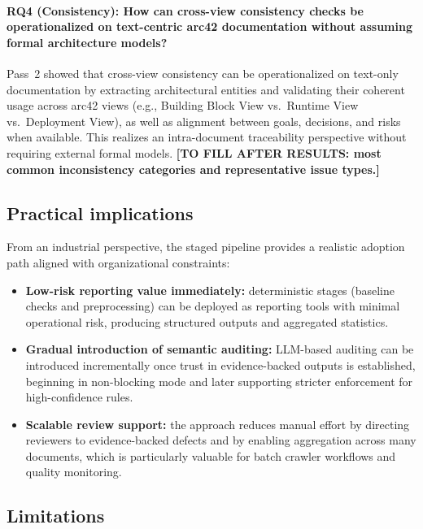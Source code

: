 \paragraph{RQ4 (Consistency): How can cross-view consistency checks be operationalized on text-centric arc42 documentation without assuming formal architecture models?}
Pass~2 showed that cross-view consistency can be operationalized on text-only documentation by extracting architectural entities and validating their coherent usage across arc42 views (e.g., Building Block View vs.\ Runtime View vs.\ Deployment View), as well as alignment between goals, decisions, and risks when available. This realizes an intra-document traceability perspective without requiring external formal models. \textbf{[TO FILL AFTER RESULTS: most common inconsistency categories and representative issue types.]}

\subsection{Practical implications}
\label{sec:conclusion_practical_implications}

From an industrial perspective, the staged pipeline provides a realistic adoption path aligned with organizational constraints:

\begin{itemize}
    \item \textbf{Low-risk reporting value immediately:} deterministic stages (baseline checks and preprocessing) can be deployed as reporting tools with minimal operational risk, producing structured outputs and aggregated statistics.

    \item \textbf{Gradual introduction of semantic auditing:} LLM-based auditing can be introduced incrementally once trust in evidence-backed outputs is established, beginning in non-blocking mode and later supporting stricter enforcement for high-confidence rules.

    \item \textbf{Scalable review support:} the approach reduces manual effort by directing reviewers to evidence-backed defects and by enabling aggregation across many documents, which is particularly valuable for batch crawler workflows and quality monitoring.
\end{itemize}

\subsection{Limitations}
\label{sec:conclusion_limitations}

